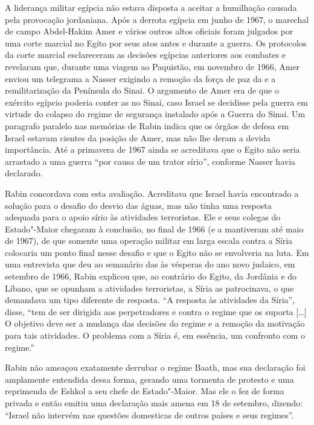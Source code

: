 A liderança militar egípcia não estava disposta a aceitar a humilhação
causada pela provocação jordaniana. Após a derrota egípcia em junho de
1967, o marechal de campo Abdel-Hakim Amer e vários outros altos
oficiais foram julgados por uma corte marcial no Egito por seus atos
antes e durante a guerra. Os protocolos da corte marcial esclareceram as
decisões egípcias anteriores aos combates e revelaram que, durante uma
viagem ao Paquistão, em novembro de 1966, Amer enviou um telegrama a
Nasser exigindo a remoção da força de paz da  e a remilitarização da
Península do Sinai. O argumento de Amer era de que o exército egípcio
poderia conter as  no Sinai, caso Israel se decidisse pela guerra em
virtude do colapso do regime de segurança instalado após a Guerra do
Sinai. Um paragrafo paralelo nas memórias de Rabin indica que os órgãos
de defesa em Israel estavam cientes da posição de Amer, mas não lhe
deram a devida importância. Até a primavera de 1967 ainda se acreditava
que o Egito não seria arrastado a uma guerra ``por causa de um trator
sírio'', conforme Nasser havia declarado.

Rabin concordava com esta avaliação. Acreditava que Israel havia
encontrado a solução para o desafio do desvio das águas, mas não tinha
uma resposta adequada para o apoio sírio às atividades terroristas. Ele
e seus colegas do Estado"-Maior chegaram à conclusão, no final de 1966 (e
a mantiveram até maio de 1967), de que somente uma operação militar em larga
escala contra a Síria colocaria um ponto final nesse desafio e que o
Egito não se envolveria na luta. Em uma entrevista que deu ao semanário
das  às vésperas do ano novo judaico, em setembro de 1966, Rabin
explicou que, ao contrário do Egito, da Jordânia e do Líbano, que se
opunham a atividades terroristas, a Síria as patrocinava, o que
demandava um tipo diferente de resposta. ``A resposta às atividades da
Síria'', disse, ``tem de ser dirigida aos perpetradores e contra o
regime que os suporta {[}\ldots{}{]} O objetivo deve ser a mudança das decisões do
regime e a remoção da motivação para tais atividades. O problema com a
Síria é, em essência, um confronto com o regime.''

Rabin não ameaçou exatamente derrubar o regime Baath, mas sua
declaração foi amplamente entendida dessa forma, gerando uma tormenta de
protesto e uma reprimenda de Eshkol a seu chefe de Estado"-Maior. Mas ele
o fez de forma privada e então emitiu uma declaração mais amena em 18 de
setembro, dizendo: ``Israel não intervém nas questões domesticas de
outros países e seus regimes''.

